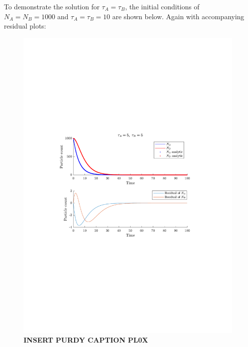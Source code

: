 \documentclass[a4paper,10pt]{article} 	%
\numberwithin{equation}{section}
\begin{document}
	To demonstrate the solution for $ \tau_A = \tau_B $, the initial conditions of $ N_A=N_B = 1000 $ and $ \tau_A=\tau_B = 10 $ are shown below. Again with accompanying residual plots:
	\begin{figure}[H]
		\centering
		\includegraphics[width=0.7\linewidth]{equaltau.pdf}
		\caption{\textbf{INSERT PURDY CAPTION PL0X}}
		\label{fig:equalTau}
	\end{figure}
	
\end{document}
